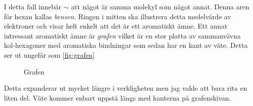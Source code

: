 I detta fall innebär $\sim$ att något är samma molekyl som något annat. Denna aren för hexan kallas \emph{bensen}. Ringen i mitten ska illustrera detta medelvärde av elektroner och visar helt enkelt att det är ett aromatiskt ämne. Ett annat intressant aromatiskt ämne är \emph{grafen} vilket är en stor platta av sammanvävna kol-hexagoner med aromatiska bindningar som sedan har en kant av väte. Detta ser ut ungefär som \vref{fig:grafen}
\begin{figure*}[h]
    \centering
    \caption{Grafen}
    \label{fig:grafen}
\end{figure*}
Detta expanderar ut mycket längre i verkligheten men jag valde att bara rita en liten del. Väte kommer enbart uppstå längs med kanterna på grafenskivan.